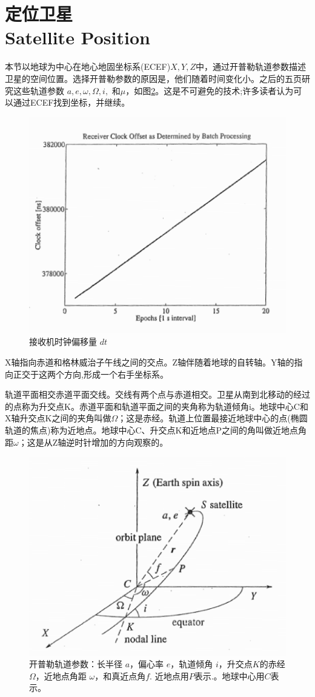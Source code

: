 \section[定位卫星]{定位卫星\\Satellite Position}
		本节以地球为中心在地心地固坐标系(ECEF)$X,Y,Z$中，通过开普勒轨道参数描述卫星的空间位置。选择开普勒参数的原因是，他们随着时间变化小。之后的五页研究这些轨道参数 $a,e,\omega,\Omega ,i,$ 和$\mu$，如图\ref{fig:9-7}。这是不可避免的技术;许多读者认为可以通过ECEF找到坐标，并继续。
	\begin{figure}
		\centering
		\includegraphics[width=0.7\linewidth]{TeX_files/Part03/chapter09/image/9-6}
		\caption{接收机时钟偏移量 $dt$}
		\label{fig:9-6}
	\end{figure}
	
	X轴指向赤道和格林威治子午线之间的交点。Z轴伴随着地球的自转轴。Y轴的指向正交于这两个方向,形成一个右手坐标系。
	
	轨道平面相交赤道平面交线。交线有两个点与赤道相交。卫星从南到北移动的经过的点称为升交点K。赤道平面和轨道平面之间的夹角称为轨道倾角i。地球中心C和X轴升交点K之间的夹角叫做$\Omega$；这是赤经。轨道上位置最接近地球中心的点(椭圆轨道的焦点)称为近地点。地球中心C、升交点K和近地点P之间的角叫做近地点角距$\omega$；这是从Z轴逆时针增加的方向观察的。
	\begin{figure}
		\centering
		\includegraphics[width=0.7\linewidth]{TeX_files/Part03/chapter09/image/9-7}
		\caption{开普勒轨道参数：长半径 $a$，偏心率 $e$，轨道倾角 $i$，升交点$K$的赤经$\Omega$，近地点角距 $\omega$，和真近点角$f$. 近地点用$P$表示.。地球中心用$C$表示。}
		\label{fig:9-7}
	\end{figure}
	
